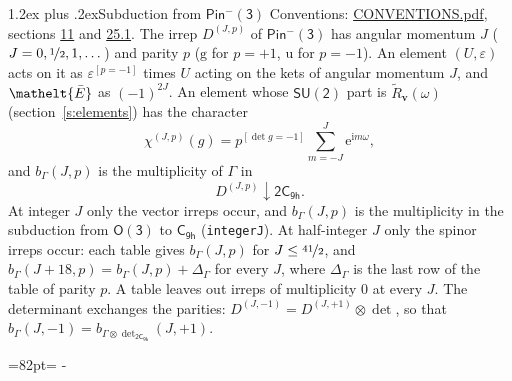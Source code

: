 \documentclass[10pt,a4paper]{article}
\makeatletter
\renewcommand\section{\@startsection{section}{1}{\z@}{-3ex plus -1ex minus -.2ex}%
  {1.2ex plus .2ex}{\normalfont\large\sffamily\bfseries\color{parttitle}}}
\newcommand{\needspace}[1]{\par\penalty-100\begingroup\dimen0=#1\relax\dimen2=\pagegoal
  \advance\dimen2-\pagetotal\ifdim\dimen0>\dimen2\relax\ifdim\dimen2>0pt\vfil\break\fi\fi
  \endgroup}
\numberwithin{equation}{section}
\newcommand{\eltfont}[1]{{\let\sigma\eltsigma\mathelt{#1}}}
\newcommand{\grp}[1]{\mathsf{#1}}
\newcommand{\elt}[1]{\eltfont{#1}}
\newcommand{\ptag}[1]{\mathrm{#1}}
\newcommand{\iverson}[1]{[#1]}
\newcommand{\restr}[2]{#1\!\downarrow#2}
\newcommand{\vv}{\mathbf{v}}
\newcommand{\iunit}{\mathrm{i}}
\newcommand{\expe}{\mathrm{e}}
\newcommand{\irrJp}[2]{D^{(#1,#2)}}
\newcommand{\irrprod}{\otimes}
\newcommand{\barred}[1]{\bar{#1}}
\newcommand{\lift}[1]{\tilde{#1}}
\makeatother
\begin{document}
\section{Subduction from \texorpdfstring{$\grp{Pin^{-}(3)}$}{Pin(3)}}\label{s:subduction_parent}
Conventions: \href{../../CONVENTIONS.pdf}{CONVENTIONS.pdf}, sections \href{../../../rotation/CONVENTIONS.pdf\#conv.11}{11} and \href{../../CONVENTIONS.pdf\#conv.25.1}{25.1}.
\leavevmode\label{n:index.J}\label{n:index.parity}\label{n:irrep.o3}The irrep $\irrJp{J}{p}$ of \href{Pinminus3.pdf}{$\grp{Pin^{-}(3)}$} has angular momentum $J$ ($J = 0, \nicefrac{1}{2}, 1, \dots$) and parity $p$ ($\ptag{g}$ for $p = +1$, $\ptag{u}$ for $p = -1$). An element $(U, \varepsilon)$ acts on it as $\varepsilon^{[p = -1]}$ times $U$ acting on the kets of angular momentum $J$, and $\elt{\barred{E}}$ as $(-1)^{2J}$. \label{n:function.character.parent}\label{n:function.multiplicity}An element whose $\grp{SU(2)}$ part is $\lift{R}_{\vv}(\omega)$ (section~\ref{s:elements}) has the character
\begin{equation}\label{e:chi}\chi^{(J,p)}(g) = p^{\iverson{\det g = -1}}\sum_{m=-J}^{J} \expe^{\iunit m\omega},\end{equation}
and $b_\Gamma(J, p)$ is the multiplicity of $\Gamma$ in
\begin{equation}\label{e:parent}\restr{\irrJp{J}{p}}{\grp{2C_{9h}}}.\end{equation}
At integer $J$ only the vector irreps occur, and $b_\Gamma(J, p)$ is the multiplicity in the subduction from $\grp{O(3)}$ to \href{../../../rotation/data/pdf/C9h.pdf}{$\grp{C_{9h}}$} (\texttt{integerJ}). \label{n:index.increment}At half-integer $J$ only the spinor irreps occur: each table gives $b_\Gamma(J, p)$ for $J \le \nicefrac{41}{2}$, and $b_\Gamma(J + 18, p) = b_\Gamma(J, p) + \Delta_\Gamma$ for every $J$, where $\Delta_\Gamma$ is the last row of the table of parity $p$. A table leaves out irreps of multiplicity 0 at every $J$.
\leavevmode\label{n:operator.determinant.character}The determinant exchanges the parities: $\irrJp{J}{-1} = \irrJp{J}{+1} \irrprod \det$, so that $b_\Gamma(J, -1) = b_{\Gamma \irrprod \det_{\grp{2C_{9h}}}}(J, +1)$.
\needspace{82pt}
\end{document}

